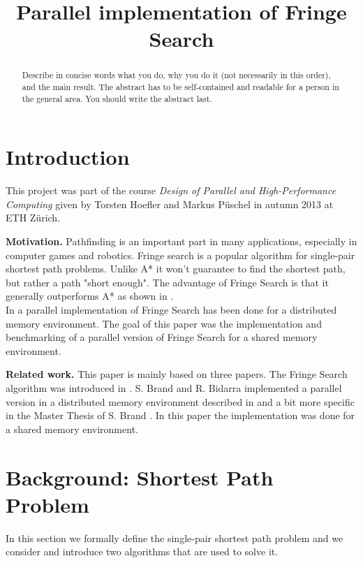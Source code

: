 \documentclass[letterpaper]{article}
\title{Parallel implementation of Fringe Search}
\newcommand{\mypar}[1]{{\bf #1.}}
\begin{document}
%
\maketitle
%

\begin{abstract}
Describe in concise words what you do, why you do it (not necessarily
in this order), and the main result.  The abstract has to be
self-contained and readable for a person in the general area. You
should write the abstract last.
\end{abstract}

\section{Introduction}\label{sec:intro}

This project was part of the course \textit{Design of Parallel and High-Performance Computing} given by Torsten Hoefler and Markus Püschel in autumn 2013 at ETH Zürich.


\mypar{Motivation} 
Pathfinding is an important part in many applications, especially in computer games and robotics. Fringe search is a popular algorithm for single-pair shortest path problems. Unlike A* it won't guarantee to find the shortest path, but rather a path "short enough". The advantage of Fringe Search is that it generally outperforms A* as shown in \cite{fringe:05}.\\
In \cite{brand:09} a parallel implementation of Fringe Search has been done for a distributed memory environment. The goal of this paper was the implementation and benchmarking of a parallel version of Fringe Search for a shared memory environment.

\mypar{Related work} This paper is mainly based on three papers. The Fringe Search algorithm was introduced in \cite{fringe:05}. S. Brand and R. Bidarra implemented a parallel version in a distributed memory environment described in \cite{brand:12} and a bit more specific in the Master Thesis of S. Brand \cite{brand:09}. In this paper the implementation was done for a shared memory environment.

\section{Background: Shortest Path Problem}\label{sec:background}
In this section we formally define the single-pair shortest path problem and we consider and introduce two algorithms that are used to solve it.
\end{document}
